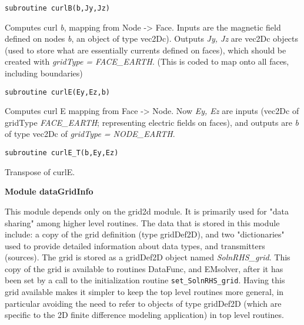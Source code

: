\documentclass[12pt]{article}
\begin{document}
\begin{verbatim}
subroutine curlB(b,Jy,Jz)
\end{verbatim}

Computes curl {\it b},  mapping from Node -> Face.
Inputs are the magnetic field defined on nodes {\it b}, an object
of type vec2Dc).  Outputs {\it Jy, Jz}
are vec2Dc objects (used to store what are
essentially currents defined on faces), which should be created with
{\it gridType = FACE\_EARTH}.  (This is coded to map onto all faces, 
including boundaries)

\begin{verbatim}
subroutine curlE(Ey,Ez,b)
\end{verbatim}

Computes curl E mapping from Face -> Node.  Now {\it Ey, Ez}
are inputs (vec2Dc of gridType {\it FACE\_EARTH}; representing
electric fields on faces), and outputs are {\it b} of type vec2Dc
of {\it gridType = NODE\_EARTH}.

\begin{verbatim}
subroutine curlE_T(b,Ey,Ez)
\end{verbatim}

Transpose of curlE.

\vspace{10pt}

\noindent
{\bf Module dataGridInfo}

This module depends only on the grid2d module.
It is primarily used for "data sharing" among higher
level routines.  The data that is stored in this
module include: a copy of the grid definition (type
gridDef2D), and two "dictionaries" used to provide
detailed information about data types, and transmitters
(sources).  The grid is stored as a gridDef2D object
named {\it SolnRHS\_grid}.  This copy of the grid is available
to routines DataFunc, and EMsolver, after it has been
set by a call to the initialization routine \verb|set_SolnRHS_grid|.
Having this grid available makes it simpler to keep the
top level routines more general, in particular avoiding the
need to refer to objects of type gridDef2D (which are
specific to the 2D finite difference modeling application)
in top level routines.
\end{document}
